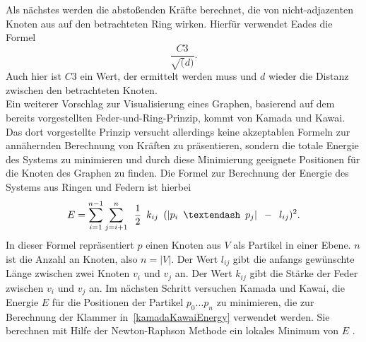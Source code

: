 \documentclass[12pt, a4paper]{article}
\begin{document}
Als nächstes werden die abstoßenden Kräfte berechnet, die von nicht-adjazenten Knoten aus auf den betrachteten Ring wirken. Hierfür verwendet Eades die Formel
\begin{equation} \label{eades_repulsiveForces}
\frac{C3}{\sqrt(d)}.
\end{equation}
Auch hier ist $C3$ ein Wert, der ermittelt werden muss und $d$ wieder die Distanz zwischen den betrachteten Knoten.\\

Ein weiterer Vorschlag zur Visualisierung eines Graphen, basierend auf dem bereits vorgestellten Feder-und-Ring-Prinzip, kommt von Kamada und Kawai. Das dort vorgestellte Prinzip versucht allerdings keine akzeptablen Formeln zur annähernden Berechnung von Kräften zu präsentieren, sondern die totale Energie des Systems zu minimieren und durch diese Minimierung geeignete Positionen für die Knoten des Graphen zu finden. Die Formel zur Berechnung der Energie des Systems aus Ringen und Federn ist hierbei
\begin{equation} \label{kamadaKawaiEnergy}
E=\sum_{i=1}^{n-1} \sum_{j=i+1}^{n} \enskip \frac{1}{2} \enskip k_{ij} \enskip (|p_i \enskip – \enskip p_j| \enskip - \enskip l_{ij})^2.
\end{equation}
In dieser Formel repräsentiert $p$ einen Knoten aus $V$ als Partikel in einer Ebene. $n$ ist die Anzahl an Knoten, also $n=|V|$. Der Wert $l_{ij}$ gibt die anfangs gewünschte Länge zwischen zwei Knoten $v_i$ und $v_j$ an. Der Wert $k_{ij}$ gibt die Stärke der Feder zwischen $v_i$ und $v_j$ an. Im nächsten Schritt versuchen Kamada und Kawai, die Energie $E$ für die Positionen der Partikel $p_0 \dots p_n$ zu minimieren, die zur Berechnung der Klammer in~\ref{kamadaKawaiEnergy} verwendet werden. Sie berechnen mit Hilfe der Newton-Raphson Methode ein lokales Minimum von $E$ \cite[S.~9]{kamada1989algorithm}.\\
\end{document}
